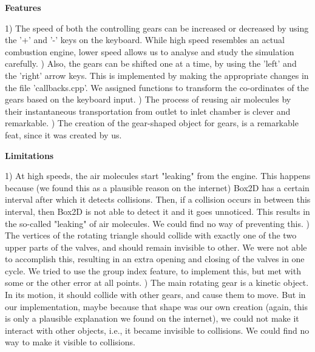 \documentclass[40pt]{article}
\begin{document}
\begin{center}

\huge{
\textbf{Features\\}}
\end{center}
\Large
{
1) The speed of both the controlling gears can be increased or decreased by using the '+' and '-' keys on the keyboard. While high speed resembles an actual combustion engine, lower speed allows us to analyse and study the simulation carefully.\newline
{}) Also, the gears can be shifted one at a time, by using the 'left' and the 'right' arrow keys. This is implemented by making the appropriate changes in the file 'callbacks.cpp'. We assigned functions to transform the co-ordinates of the gears based on the keyboard input.\newline
{}) The process of reusing air molecules by their instantaneous transportation from outlet to inlet chamber is clever and remarkable.\newline
{}) The creation of the gear-shaped object for gears, is a remarkable feat, since it was created by us.
\newline
}



\begin{center}

\huge{
\textbf{Limitations\\}}
\end{center}
\Large
{
1) At high speeds, the air molecules start "leaking" from the engine. This happens because (we found this as a plausible reason on the internet) Box2D has a certain interval after which it detects collisions. Then, if a collision occurs in between this interval, then Box2D is not able to detect it and it goes unnoticed. This results in the so-called "leaking" of air molecules. We could find no way of preventing this.\newline
{}) The vertices of the rotating triangle should collide with exactly one of the two upper parts of the valves, and should remain invisible to other. We were not able to accomplish this, resulting in an extra opening and closing of the valves in one cycle. We tried to use the group index feature, to implement this, but met with some or the other error at all points.
\newline
{}) The main rotating gear is a kinetic object. In its motion, it should collide with other gears, and cause them to move. But in our implementation, maybe because that shape was our own creation (again, this is only a plausible explanation we found on the internet), we could not make it interact with other objects, i.e., it became invisible to collisions. We could find no way to make it visible to collisions.
\newline
\newline
}
\end{document}

